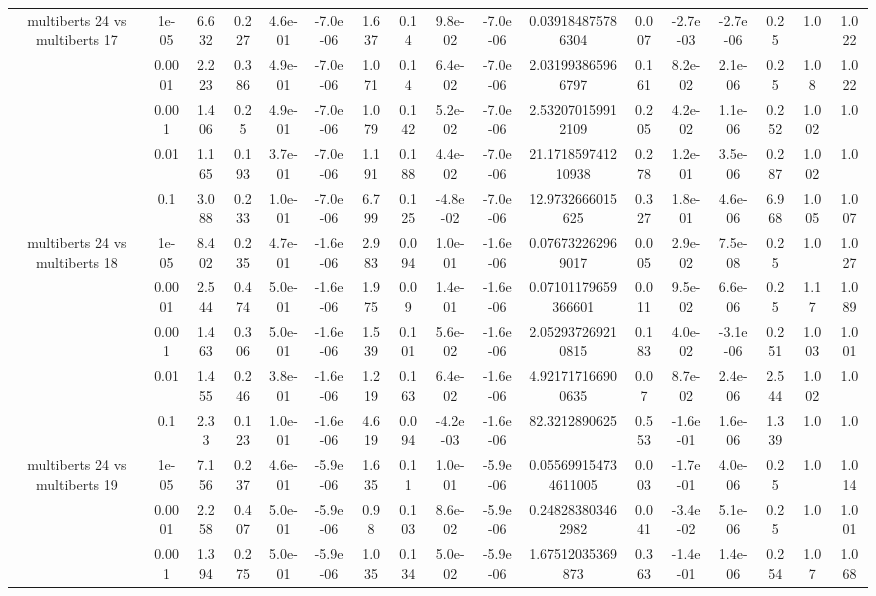 \begin{tabular}{|c|c|c|c|c|c|c|c|c|c|c|c|c|c|c|c|c|}
\hline
\multirow{5}{*}{multiberts 24 vs multiberts 17} & 1e-05 & 6.632 & 0.227 & 4.6e-01 & -7.0e-06 & 1.637 & 0.14 & 9.8e-02 & -7.0e-06 & 0.039184875786304 & 0.007 & -2.7e-03 & -2.7e-06 & 0.25 & 1.0 & 1.022 \\
 & 0.0001 & 2.223 & 0.386 & 4.9e-01 & -7.0e-06 & 1.071 & 0.14 & 6.4e-02 & -7.0e-06 & 2.031993865966797 & 0.161 & 8.2e-02 & 2.1e-06 & 0.25 & 1.08 & 1.022 \\
 & 0.001 & 1.406 & 0.25 & 4.9e-01 & -7.0e-06 & 1.079 & 0.142 & 5.2e-02 & -7.0e-06 & 2.532070159912109 & 0.205 & 4.2e-02 & 1.1e-06 & 0.252 & 1.002 & 1.0 \\
 & 0.01 & 1.165 & 0.193 & 3.7e-01 & -7.0e-06 & 1.191 & 0.188 & 4.4e-02 & -7.0e-06 & 21.171859741210938 & 0.278 & 1.2e-01 & 3.5e-06 & 0.287 & 1.002 & 1.0 \\
 & 0.1 & 3.088 & 0.233 & 1.0e-01 & -7.0e-06 & 6.799 & 0.125 & -4.8e-02 & -7.0e-06 & 12.9732666015625 & 0.327 & 1.8e-01 & 4.6e-06 & 6.968 & 1.005 & 1.007 \\
\hline
\multirow{5}{*}{multiberts 24 vs multiberts 18} & 1e-05 & 8.402 & 0.235 & 4.7e-01 & -1.6e-06 & 2.983 & 0.094 & 1.0e-01 & -1.6e-06 & 0.076732262969017 & 0.005 & 2.9e-02 & 7.5e-08 & 0.25 & 1.0 & 1.027 \\
 & 0.0001 & 2.544 & 0.474 & 5.0e-01 & -1.6e-06 & 1.975 & 0.09 & 1.4e-01 & -1.6e-06 & 0.07101179659366601 & 0.011 & 9.5e-02 & 6.6e-06 & 0.25 & 1.17 & 1.089 \\
 & 0.001 & 1.463 & 0.306 & 5.0e-01 & -1.6e-06 & 1.539 & 0.101 & 5.6e-02 & -1.6e-06 & 2.052937269210815 & 0.183 & 4.0e-02 & -3.1e-06 & 0.251 & 1.003 & 1.001 \\
 & 0.01 & 1.455 & 0.246 & 3.8e-01 & -1.6e-06 & 1.219 & 0.163 & 6.4e-02 & -1.6e-06 & 4.921717166900635 & 0.07 & 8.7e-02 & 2.4e-06 & 2.544 & 1.002 & 1.0 \\
 & 0.1 & 2.33 & 0.123 & 1.0e-01 & -1.6e-06 & 4.619 & 0.094 & -4.2e-03 & -1.6e-06 & 82.3212890625 & 0.553 & -1.6e-01 & 1.6e-06 & 1.339 & 1.0 & 1.0 \\
\hline
\multirow{5}{*}{multiberts 24 vs multiberts 19} & 1e-05 & 7.156 & 0.237 & 4.6e-01 & -5.9e-06 & 1.635 & 0.11 & 1.0e-01 & -5.9e-06 & 0.055699154734611005 & 0.003 & -1.7e-01 & 4.0e-06 & 0.25 & 1.0 & 1.014 \\
 & 0.0001 & 2.258 & 0.407 & 5.0e-01 & -5.9e-06 & 0.98 & 0.103 & 8.6e-02 & -5.9e-06 & 0.248283803462982 & 0.041 & -3.4e-02 & 5.1e-06 & 0.25 & 1.0 & 1.001 \\
 & 0.001 & 1.394 & 0.275 & 5.0e-01 & -5.9e-06 & 1.035 & 0.134 & 5.0e-02 & -5.9e-06 & 1.67512035369873 & 0.363 & -1.4e-01 & 1.4e-06 & 0.254 & 1.07 & 1.068 \\

\end{tabular}
